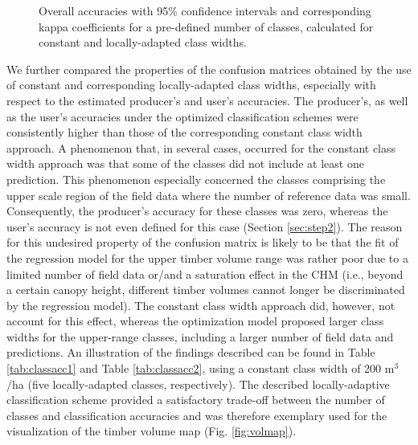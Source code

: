 \begin{figure}[H]
	\centering
	\caption{Overall accuracies with 95\% confidence intervals and corresponding kappa coefficients for a pre-defined number of classes, calculated for constant and locally-adapted class widths.}
	\label{fig:accuracies}
\end{figure}

We further compared the properties of the confusion matrices obtained by the use of constant and corresponding locally-adapted class widths, especially with respect to the estimated producer's and user's accuracies. The producer's, as well as the user's accuracies under the optimized classification schemes were consistently higher than those of the corresponding constant class width approach. A phenomenon that, in several cases, occurred for the constant class width approach was that some of the classes did not include at least one prediction. This phenomenon especially concerned the classes comprising the upper scale region of the field data where the number of reference data was small. Consequently, the producer's accuracy for these classes was zero, whereas the user's accuracy is not even defined for this case (Section \ref{sec:step2}). The reason for this undesired property of the confusion matrix is likely to be that the fit of the regression model for the upper timber volume range was rather poor due to a limited number of field data or/and a saturation effect in the CHM (i.e., beyond a certain canopy height, different timber volumes cannot longer be discriminated by the regression model). The constant class width approach did, however, not account for this effect, whereas the optimization model proposed larger class widths for the upper-range classes, including a larger number of field data and predictions. An illustration of the findings described can be found in Table \ref{tab:classacc1} and Table \ref{tab:classacc2}, using a constant class width of 200 m$^3$/ha (five locally-adapted classes, respectively). The described locally-adaptive classification scheme provided a satisfactory trade-off between the number of classes and classification accuracies and was therefore exemplary used for the visualization of the timber volume map (Fig. \ref{fig:volmap}).


